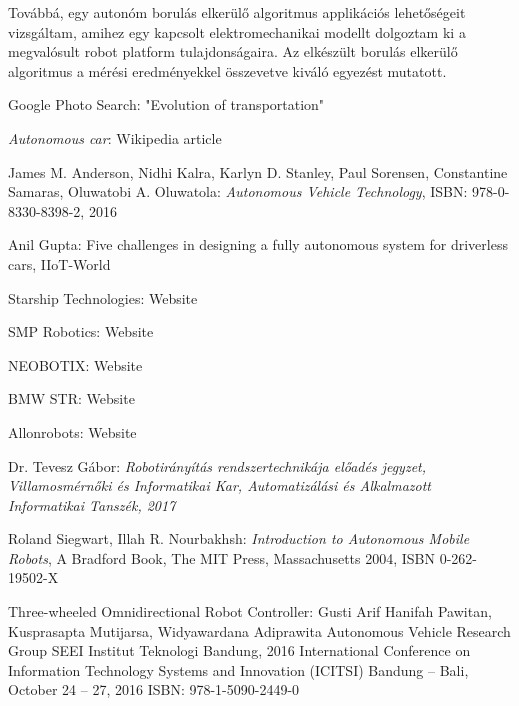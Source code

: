 \documentclass[12pt,english,twoside]{article}
\begin{document}
Továbbá, egy autonóm borulás elkerülő algoritmus applikációs lehetőségeit vizsgáltam, amihez egy kapcsolt elektromechanikai modellt dolgoztam ki a megvalósult robot platform tulajdonságaira. Az elkészült borulás elkerülő algoritmus a mérési 
eredményekkel összevetve kiváló egyezést mutatott.


\newpage
\newpage
\begin{thebibliography}{1}
	
	
	 Google Photo Search: "Evolution of transportation"
	
	\emph{Autonomous car}: Wikipedia article
	
	James M. Anderson, Nidhi Kalra, Karlyn D. Stanley, Paul Sorensen, Constantine Samaras, Oluwatobi A. Oluwatola: \emph{Autonomous Vehicle Technology}, ISBN: 978-0-8330-8398-2, 2016
	
	Anil Gupta: Five challenges in designing a fully autonomous system for driverless cars, IIoT-World
	
	Starship Technologies: Website
	
	SMP Robotics: Website
	
	NEOBOTIX: Website
	
	BMW STR: Website
	
	 Allonrobots: Website
	
	Dr. Tevesz Gábor:
	\emph{Robotirányítás rendszertechnikája előadés jegyzet, Villamosmérnőki és Informatikai Kar, Automatizálási és Alkalmazott Informatikai Tanszék, 2017}
	
	Roland Siegwart, Illah R. Nourbakhsh:
	\emph{Introduction to Autonomous Mobile Robots}, A Bradford Book, The MIT Press, Massachusetts 2004,
	ISBN 0-262-19502-X
	
	 Three-wheeled Omnidirectional Robot Controller: Gusti Arif Hanifah Pawitan, Kusprasapta Mutijarsa, Widyawardana Adiprawita
	Autonomous Vehicle Research Group SEEI Institut Teknologi Bandung, 2016 International Conference on Information Technology Systems and Innovation (ICITSI)
	Bandung – Bali, October 24 – 27, 2016 ISBN: 978-1-5090-2449-0
	

\end{thebibliography}
\end{document}
